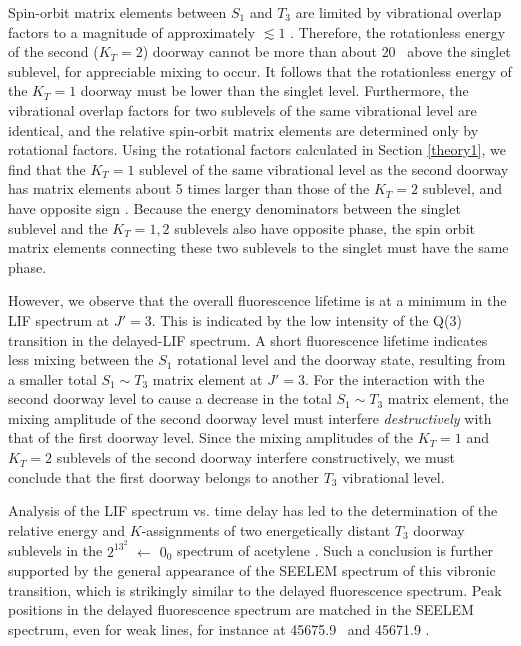 

Spin-orbit matrix elements between $S_1$ and $T_3$ are limited by
vibrational overlap factors to a magnitude of approximately $\lesssim
1$ \rcm.  Therefore, the rotationless energy of the second ($K_T=2$)
doorway cannot be more than about $20$ \rcm\ above the singlet
sublevel, for appreciable mixing to occur.  It follows that the
rotationless energy of the $K_T=1$ doorway must be lower than the
singlet level.  Furthermore, the vibrational overlap factors for two
sublevels of the same vibrational level are identical, and the
relative spin-orbit matrix elements are determined only by rotational
factors.  Using the rotational factors calculated in Section
\ref{theory1}, we find that the $K_T=1$ sublevel of the same
vibrational level as the second doorway has matrix elements about 5
times larger than those of the $K_T=2$ sublevel, and have opposite
sign \cite{stevens73}.  Because the energy denominators between the
singlet sublevel and the $K_T=1,2$ sublevels also have opposite phase,
the spin orbit matrix elements connecting these two sublevels to the
singlet must have the same phase.

However, we observe that the overall fluorescence lifetime is at a
minimum in the LIF spectrum at $J'=3$.  This is indicated by the low
intensity of the Q(3) transition in the delayed-LIF spectrum.  A short
fluorescence lifetime indicates less mixing between the $S_1$
rotational level and the doorway state, resulting from a smaller total
$S_1 \sim T_3$ matrix element at $J'=3$.  For the interaction with the
second doorway level to cause a decrease in the total $S_1 \sim T_3$
matrix element, the mixing amplitude of the second doorway level must
interfere \emph{destructively} with that of the first doorway level.
Since the mixing amplitudes of the $K_T=1$ and $K_T=2$ sublevels of
the second doorway interfere constructively, we must conclude that the
first doorway belongs to another $T_3$ vibrational level.

Analysis of the LIF spectrum vs. time delay has led to the
determination of the relative energy and $K$-assignments of two
energetically distant $T_3$ doorway sublevels in the $2^13^2$ 
$\leftarrow$ $0_0$ spectrum of acetylene \astate.  Such a conclusion
is further supported by the general appearance of the SEELEM spectrum
of this vibronic transition, which is strikingly similar to the
delayed fluorescence spectrum.  Peak positions in the delayed
fluorescence spectrum are matched in the SEELEM spectrum, even for
weak lines, for instance at 45675.9 \rcm\ and 45671.9 \rcm.  


